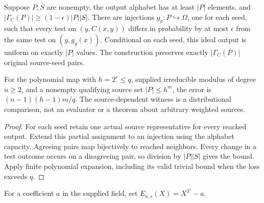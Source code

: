 \begin{theorem}
  \label{thm:lowerbounds-algebraic-flat-lossless}
  \leanok
  Suppose $P,S$ are nonempty, the output alphabet has at least $|P|$
  elements, and $|\Gamma_C(P)|\ge(1-\epsilon)|P||S|$. There are
  injections $g_y:P\hookrightarrow\Omega$, one for each seed,
  such that every test on $(y,C(x,y))$ differs in probability by at
  most $\epsilon$ from the same test on $(y,g_y(x))$.
  Conditional on each seed, this ideal output is uniform on exactly
  $|P|$ values. The construction preserves exactly $|\Gamma_C(P)|$
  original source-seed pairs.

  For the polynomial map with $h=2^r\le q$, supplied irreducible
  modulus of degree $n\ge2$, and a nonempty qualifying source set
  $|P|\le h^m$, the error is $(n-1)(h-1)m/q$. The source-dependent
  witness is a distributional comparison, not an evaluator or a
  theorem about arbitrary weighted sources.
\end{theorem}
\begin{proof}
  \leanok
  For each seed retain one actual source representative for every
  reached output. Extend this partial assignment to an injection using
  the alphabet capacity. Agreeing pairs map bijectively to reached
  neighbors. Every change in a test outcome occurs on a disagreeing
  pair, so division by $|P||S|$ gives the bound. Apply finite polynomial
  expansion, including its valid trivial bound when the loss exceeds $q$.
\end{proof}

\begin{definition}
  \label{def:lowerbounds-algebraic-binomial-modulus}
  \leanok
  For a coefficient $a$ in the supplied field, set
  $E_{a,s}(X)=X^{3^s}-a$.
\end{definition}

